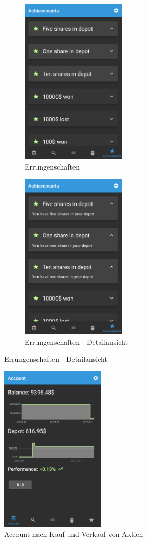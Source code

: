 \documentclass[a4paper]{article}
\begin{document}
\begin{figure}[H]
	\begin{subfigure}{.5\textwidth}
		\centering
		\includegraphics[height=8cm,keepaspectratio]{./images/demo/achievements_closed.png}
		\caption{Errungenschaften}
		\label{fig:demo:achievements}
	\end{subfigure}
	\begin{subfigure}{.5\textwidth}
		\centering
		\includegraphics[height=8cm,keepaspectratio]{./images/demo/achievements_open.png}
		\caption{Errungenschaften - Detailansicht}
		\label{fig:demo:achievements_open}
	\end{subfigure}
\end{figure}

\begin{figure}[H]
	\centering
	\includegraphics[height=8cm,keepaspectratio]{./images/demo/end.png}
	\caption{Account nach Kauf und Verkauf von Aktien}
	\label{fig:demo:end}
\end{figure}
\end{document}
